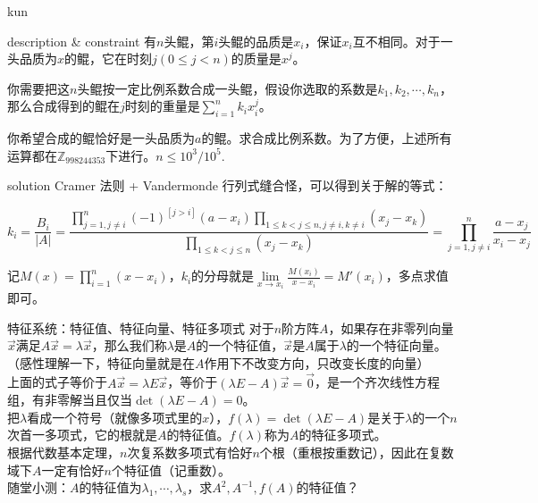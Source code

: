 \documentclass{beamer}
\begin{document}
\begin{frame}{kun}
	\begin{block}{description \& constraint}
		有$n$头鲲，第$i$头鲲的品质是$x_i$，保证$x_i$互不相同。对于一头品质为$x$的鲲，它在时刻$j(0 \le j < n)$的质量是$x^j$。
		
		你需要把这$n$头鲲按一定比例系数合成一头鲲，假设你选取的系数是$k_1, k_2, \cdots, k_n$，那么合成得到的鲲在$j$时刻的重量是$\sum\limits_{i=1}^nk_ix_i^j$。
		
		你希望合成的鲲恰好是一头品质为$a$的鲲。求合成比例系数。为了方便，上述所有运算都在$\mathbb Z_{998244353}$下进行。$n \le 10^3 / 10^5.$
	\end{block}
	\pause
	\begin{block}{solution}
		Cramer 法则 + Vandermonde 行列式缝合怪，可以得到关于解的等式：
		
		$$k_i = \frac{B_i}{|A|} = \frac{\prod_{j=1,j\neq i}^{n}(-1)^{[j > i]}(a-x_i)\prod_{1 \le k < j \le n, j \neq i, k \neq i}(x_j - x_k)}{\prod_{1 \le k < j \le n}(x_j - x_k)} = \prod_{j = 1, j \neq i}^{n}\frac{a - x_j}{x_i - x_j}$$
		
		记$M(x) = \prod_{i=1}^n(x - x_i)$，$k_i$的分母就是$\lim\limits_{x\to x_i}\frac{M(x_i)}{x - x_i} = M'(x_i)$，多点求值即可。
	\end{block}
\end{frame}

\begin{frame}{特征系统：特征值、特征向量、特征多项式}
	对于$n$阶方阵$A$，如果存在非零列向量$\vec{x}$满足$A\vec{x} = \lambda\vec{x}$，那么我们称$\lambda$是$A$的一个特征值，$\vec{x}$是$A$属于$\lambda$的一个特征向量。\\
	
	（感性理解一下，特征向量就是在$A$作用下不改变方向，只改变长度的向量）\\
	
	上面的式子等价于$A\vec{x} = \lambda E\vec{x}$，等价于$(\lambda E - A)\vec{x} = \vec{0}$，是一个齐次线性方程组，有非零解当且仅当$\det(\lambda E - A) = 0$。\\
	
	把$\lambda$看成一个符号（就像多项式里的$x$），$f(\lambda) = \det(\lambda E - A)$是关于$\lambda$的一个$n$次首一多项式，它的根就是$A$的特征值。$f(\lambda)$称为$A$的特征多项式。\\
	
	根据代数基本定理，$n$次复系数多项式有恰好$n$个根（重根按重数记），因此在复数域下$A$一定有恰好$n$个特征值（记重数）。\\
	
	随堂小测：$A$的特征值为$\lambda_1, \cdots, \lambda_s$，求$A^2, A^{-1}, f(A)$的特征值？
	
\end{frame}
\end{document}
